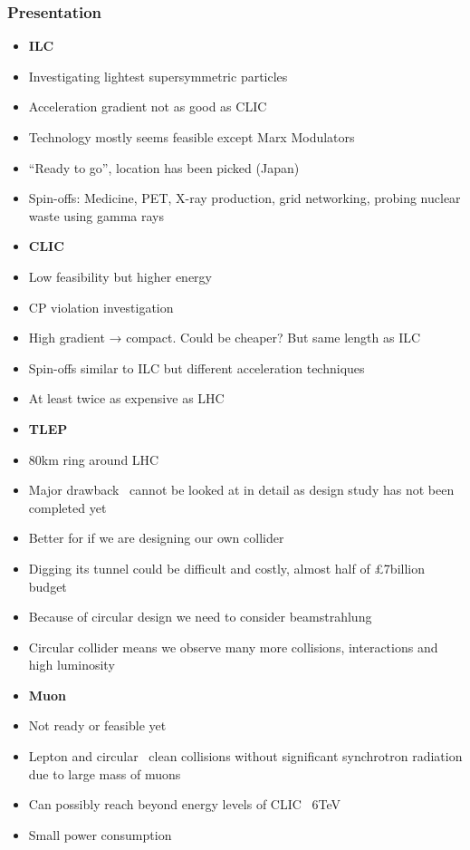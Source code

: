 \subsubsection{Presentation}

\begin{itemize}
\item \textbf{ILC}
\item  Investigating lightest supersymmetric particles
\item  Acceleration gradient not as good as CLIC
\item  Technology mostly seems feasible except Marx Modulators
\item  “Ready to go”, location has been picked (Japan)
\item  Spin-offs: Medicine, PET, X-ray production, grid networking, probing nuclear waste using gamma rays
\item \textbf{CLIC}
\item  Low feasibility but higher energy
\item  CP violation investigation
\item  High gradient → compact. Could be cheaper? But same length as ILC
\item  Spin-offs similar to ILC but different acceleration techniques
\item  At least twice as expensive as LHC
\item \textbf{TLEP}
\item  80km ring around LHC
\item  Major drawback  \textemdash \, cannot be looked at in detail as design study has not been completed yet
\item  Better for if we are designing our own collider
\item  Digging its tunnel could be difficult and costly, almost half of £7billion budget
\item  Because of circular design we need to consider beamstrahlung
\item  Circular collider means we observe many more collisions, interactions and high luminosity
 
\item \textbf{Muon}
\item  Not ready or feasible yet
\item  Lepton and circular  \textemdash \, clean collisions without significant synchrotron radiation due to large mass of muons
\item  Can possibly reach beyond energy levels of CLIC ~6TeV
\item  Small power consumption
\end{itemize}

